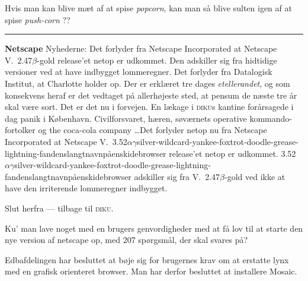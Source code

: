 \documentclass[10pt]{article}
\begin{document}
\begin{sketch}
 Hvis man kan blive mæt af at spise {\em popcorn},
kan man så blive sulten igen af at spise {\em push-corn} ??

\vspace{0.5cm}\hrule {{\flushleft\Large\bf Netscape} Nyhederne: Det
  forlyder fra Netscape Incorporated at Netscape V.\ 2.47$\beta$-gold
  release'et netop er udkommet.  Den adskiller sig fra hidtidige versioner
  ved at have indbygget lommeregner. Det forlyder fra Datalogisk Institut,
  at Charlotte holder op. Der er erklæret tre dages \emph{etellerandet}, og
  som konsekvens heraf er det vedtaget på allerhøjeste sted, at pensum de
  næste tre år skal være sort. Det er det nu i forvejen. En lækage i
  \textsc{diku}s kantine forårsagede i dag panik i København.
  Civilforsvaret, hæren, søværnets operative kommando-fortolker og the
  coca-cola company \ldots Det forlyder netop nu fra Netscape Incorporated
  at Netscape V.\ 
  3.52$\alpha\gamma$silver-wild\-card-yankee-foxtrot-doodle-grease-lightning-fan\-dens\-langt\-navn\-på\-en\-ski\-de\-brow\-ser
  release'et netop er udkommet.
  3.52$\alpha\gamma$silver-wild\-card-yankee-foxtrot-doodle-grease-lightning-fan\-dens\-langt\-navn\-på\-en\-ski\-de\-brow\-ser
  adskiller sig fra V.\ 2.47$\beta$-gold ved ikke at have den irriterende
  lommeregner indbygget.

  Slut herfra --- tilbage til \textsc{diku}.

  Ku' man lave noget med en brugers genvordigheder med at få lov til at
  starte den nye version af netscape op, med 207 spørgsmål, der skal svares
  på?

  Edbafdelingen har besluttet at bøje sig for brugernes krav om at
  erstatte lynx med en grafisk orienteret browser. Man har derfor besluttet
  at installere Mosaic.}

\end{sketch}
\end{document}
